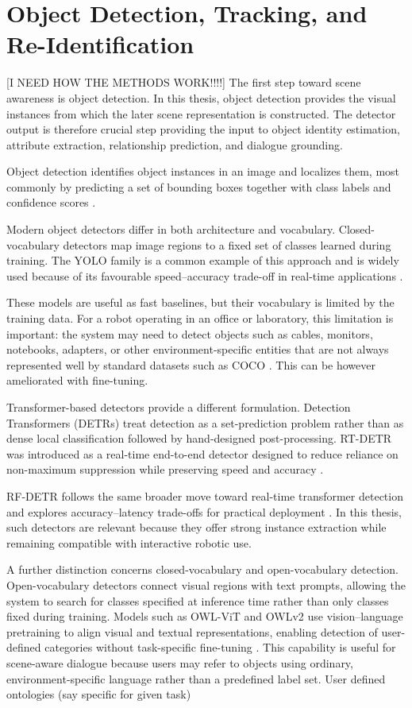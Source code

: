 \section{Object Detection, Tracking, and Re-Identification}
[I NEED HOW THE METHODS WORK!!!!]
The first step toward scene awareness is object detection. In this thesis, object detection provides the visual instances from which the later scene representation is constructed. The detector output is therefore crucial step providing the input to object identity estimation, attribute extraction, relationship prediction, and dialogue grounding.

Object detection identifies object instances in an image and localizes them, most commonly by predicting a set of bounding boxes together with class labels and confidence scores \cite[Part XIII]{foundationsCVbook}.

Modern object detectors differ in both architecture and vocabulary. Closed-vocabulary detectors map image regions to a fixed set of classes learned during training. The YOLO family is a common example of this approach and is widely used because of its favourable speed--accuracy trade-off in real-time applications \cite{sapkota_ultralytics_2026}.

These models are useful as fast baselines, but their vocabulary is limited by the training data. For a robot operating in an office or laboratory, this limitation is important: the system may need to detect objects such as cables, monitors, notebooks, adapters, or other environment-specific entities that are not always represented well by standard datasets such as COCO \cite{lin2015microsoftcococommonobjects}. This can be however ameliorated with fine-tuning.

Transformer-based detectors provide a different formulation. Detection Transformers (DETRs) treat detection as a set-prediction problem rather than as dense local classification followed by hand-designed post-processing. RT-DETR was introduced as a real-time end-to-end detector designed to reduce reliance on non-maximum suppression while preserving speed and accuracy \cite{zhao_detrs_2024}.

RF-DETR follows the same broader move toward real-time transformer detection and explores accuracy--latency trade-offs for practical deployment \cite{robinson_rf-detr_2026}. In this thesis, such detectors are relevant because they offer strong instance extraction while remaining compatible with interactive robotic use.

A further distinction concerns closed-vocabulary and open-vocabulary detection. Open-vocabulary detectors connect visual regions with text prompts, allowing the system to search for classes specified at inference time rather than only classes fixed during training. Models such as OWL-ViT and OWLv2 use vision--language pretraining to align visual and textual representations, enabling detection of user-defined categories without task-specific fine-tuning \cite{minderer_simple_2022,minderer_scaling_2024}. This capability is useful for scene-aware dialogue because users may refer to objects using ordinary, environment-specific language rather than a predefined label set. User defined ontologies (say specific for given task)

